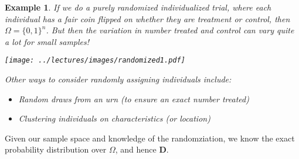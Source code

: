 \documentclass{tufte-handout}
\theoremstyle{break}
\newtheorem{exmp}{Example}
\begin{document}
\begin{boxD}
  \begin{exmp}
    If we do a purely randomized individualized trial, where
    each individual has a fair coin flipped on whether they are
    treatment or control, then $\Omega = \{0,1\}^{n}$. But then
    the variation in number treated and control can vary quite a
    lot for small samples!

    \centering
    \texttt{[image: ../lectures/images/randomized1.pdf]}

    \raggedright
    Other ways to consider randomly assigning individuals include:
    \begin{itemize}
      \item Random draws from an urn (to ensure an exact number treated)
      \item Clustering individuals on characteristics (or location)
    \end{itemize}
  \end{exmp}
\end{boxD}

Given our sample space and knowledge of the randomziation, we know the exact probability distribution over $\Omega$, and hence $\mathbf{D}$.
\end{document}
